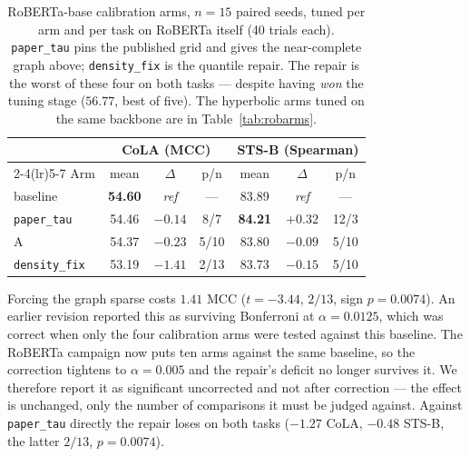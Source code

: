 \documentclass{article}
\begin{document}
\begin{table}[h]
\caption{RoBERTa-base calibration arms, $n=15$ paired seeds, tuned per arm and
per task on RoBERTa itself (40 trials each). \texttt{paper\_tau} pins the
published grid and gives the near-complete graph above; \texttt{density\_fix} is
the quantile repair. The repair is the worst of these four on both tasks ---
despite having \emph{won} the tuning stage ($56.77$, best of five). The
hyperbolic arms tuned on the same backbone are in Table~\ref{tab:robarms}.}
\label{tab:roberta}
\begin{center}
\small
\begin{tabular}{lcccccc}
\toprule
 & \multicolumn{3}{c}{CoLA (MCC)} & \multicolumn{3}{c}{STS-B (Spearman)} \\
\cmidrule(lr){2-4}\cmidrule(lr){5-7}
Arm & mean & $\Delta$ & p/n & mean & $\Delta$ & p/n \\
\midrule
baseline              & \textbf{54.60} & \emph{ref} & --- & 83.89 & \emph{ref} & --- \\
\texttt{paper\_tau}   & 54.46 & $-0.14$ & \phantom{0}8/7 & \textbf{84.21} & $\mathbf{+0.32}$ & 12/3 \\
A                     & 54.37 & $-0.23$ & \phantom{0}5/10 & 83.80 & $-0.09$ & \phantom{0}5/10 \\
\texttt{density\_fix} & 53.19 & $\mathbf{-1.41}$ & \phantom{0}2/13 & 83.73 & $-0.15$ & \phantom{0}5/10 \\
\bottomrule
\end{tabular}
\end{center}
\end{table}

Forcing the graph sparse costs $1.41$ MCC ($t=-3.44$, $2/13$, sign $p=0.0074$).
An earlier revision reported this as surviving Bonferroni at $\alpha=0.0125$,
which was correct when only the four calibration arms were tested against this
baseline. The RoBERTa campaign now puts ten arms against the same baseline, so
the correction tightens to $\alpha=0.005$ and the repair's deficit no longer
survives it. We therefore report it as significant uncorrected and not after
correction --- the effect is unchanged, only the number of comparisons it must
be judged against. Against \texttt{paper\_tau} directly the repair loses on both
tasks ($-1.27$ CoLA, $-0.48$ STS-B, the latter $2/13$, $p=0.0074$).
\end{document}
